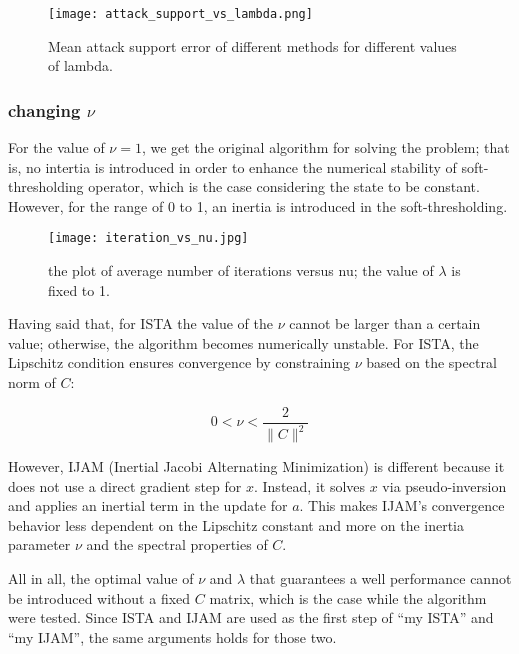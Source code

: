 \begin{figure}[H] %
    \centering
    \texttt{[image: attack\_support\_vs\_lambda.png]} %
    \caption{Mean attack support error of different methods for different values of lambda.}
    \label{fig:example}
\end{figure}


\subsubsection{changing $\nu$}
For the value of $\nu = 1$, we get the original algorithm for solving the problem; that is, no intertia is introduced in order to enhance the numerical stability of soft-thresholding operator, which is the case considering the state to be constant. However, for the range of  0 to 1, an inertia is introduced in the soft-thresholding. 

\begin{figure}[H] %
    \centering
    \texttt{[image: iteration\_vs\_nu.jpg]} %
    \caption{the plot of average number of iterations versus nu; the value of $\lambda$ is fixed to 1.}
    \label{fig:example}
\end{figure}

Having said that, for ISTA the value of the $\nu$ cannot be larger than a certain value; otherwise, the algorithm becomes numerically unstable. For ISTA, the Lipschitz condition ensures convergence by constraining 
\( \nu \) based on the spectral norm of \( C \):

\[
0 < \nu < \frac{2}{\|C\|^2}
\]

However, IJAM (Inertial Jacobi Alternating Minimization) is different because it does not use a direct gradient step for \( x \). Instead, it solves \( x \) via pseudo-inversion and applies an inertial term in the update for \( a \). This makes IJAM's convergence behavior less dependent on the Lipschitz constant and more on the inertia parameter \( \nu \) and the spectral properties of \( C \).

All in all, the optimal value of $\nu$ and $\lambda$ that guarantees a well performance cannot be introduced without a fixed $C$ matrix, which is the case while the algorithm were tested. Since ISTA and IJAM are used as the first step of ``my ISTA'' and ``my IJAM'', the same arguments holds for those two.

